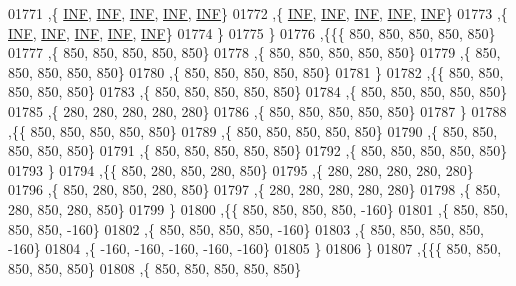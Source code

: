 \begin{DoxyCode}
01771    ,\{   \mbox{\hyperlink{energy__const_8h_a12c2040f25d8e3a7b9e1c2024c618cb6}{INF}},   \mbox{\hyperlink{energy__const_8h_a12c2040f25d8e3a7b9e1c2024c618cb6}{INF}},   \mbox{\hyperlink{energy__const_8h_a12c2040f25d8e3a7b9e1c2024c618cb6}{INF}},   \mbox{\hyperlink{energy__const_8h_a12c2040f25d8e3a7b9e1c2024c618cb6}{INF}},   \mbox{\hyperlink{energy__const_8h_a12c2040f25d8e3a7b9e1c2024c618cb6}{INF}}\}
01772    ,\{   \mbox{\hyperlink{energy__const_8h_a12c2040f25d8e3a7b9e1c2024c618cb6}{INF}},   \mbox{\hyperlink{energy__const_8h_a12c2040f25d8e3a7b9e1c2024c618cb6}{INF}},   \mbox{\hyperlink{energy__const_8h_a12c2040f25d8e3a7b9e1c2024c618cb6}{INF}},   \mbox{\hyperlink{energy__const_8h_a12c2040f25d8e3a7b9e1c2024c618cb6}{INF}},   \mbox{\hyperlink{energy__const_8h_a12c2040f25d8e3a7b9e1c2024c618cb6}{INF}}\}
01773    ,\{   \mbox{\hyperlink{energy__const_8h_a12c2040f25d8e3a7b9e1c2024c618cb6}{INF}},   \mbox{\hyperlink{energy__const_8h_a12c2040f25d8e3a7b9e1c2024c618cb6}{INF}},   \mbox{\hyperlink{energy__const_8h_a12c2040f25d8e3a7b9e1c2024c618cb6}{INF}},   \mbox{\hyperlink{energy__const_8h_a12c2040f25d8e3a7b9e1c2024c618cb6}{INF}},   \mbox{\hyperlink{energy__const_8h_a12c2040f25d8e3a7b9e1c2024c618cb6}{INF}}\}
01774    \}
01775   \}
01776  ,\{\{\{   850,   850,   850,   850,   850\}
01777    ,\{   850,   850,   850,   850,   850\}
01778    ,\{   850,   850,   850,   850,   850\}
01779    ,\{   850,   850,   850,   850,   850\}
01780    ,\{   850,   850,   850,   850,   850\}
01781    \}
01782   ,\{\{   850,   850,   850,   850,   850\}
01783    ,\{   850,   850,   850,   850,   850\}
01784    ,\{   850,   850,   850,   850,   850\}
01785    ,\{   280,   280,   280,   280,   280\}
01786    ,\{   850,   850,   850,   850,   850\}
01787    \}
01788   ,\{\{   850,   850,   850,   850,   850\}
01789    ,\{   850,   850,   850,   850,   850\}
01790    ,\{   850,   850,   850,   850,   850\}
01791    ,\{   850,   850,   850,   850,   850\}
01792    ,\{   850,   850,   850,   850,   850\}
01793    \}
01794   ,\{\{   850,   280,   850,   280,   850\}
01795    ,\{   280,   280,   280,   280,   280\}
01796    ,\{   850,   280,   850,   280,   850\}
01797    ,\{   280,   280,   280,   280,   280\}
01798    ,\{   850,   280,   850,   280,   850\}
01799    \}
01800   ,\{\{   850,   850,   850,   850,  -160\}
01801    ,\{   850,   850,   850,   850,  -160\}
01802    ,\{   850,   850,   850,   850,  -160\}
01803    ,\{   850,   850,   850,   850,  -160\}
01804    ,\{  -160,  -160,  -160,  -160,  -160\}
01805    \}
01806   \}
01807  ,\{\{\{   850,   850,   850,   850,   850\}
01808    ,\{   850,   850,   850,   850,   850\}

\end{DoxyCode}
